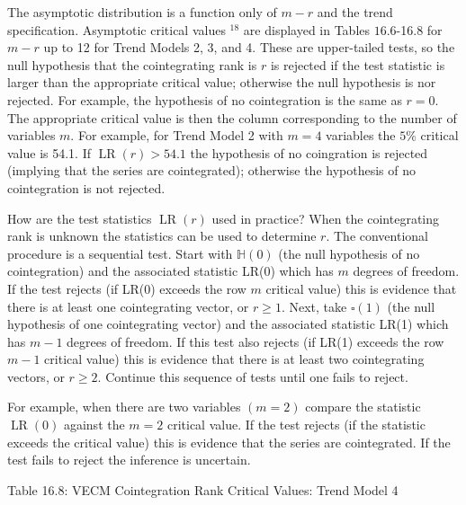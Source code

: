 \documentclass[10pt]{article}
\begin{document}
The asymptotic distribution is a function only of $m-r$ and the trend specification. Asymptotic critical values ${ }^{18}$ are displayed in Tables $16.6$-16.8 for $m-r$ up to 12 for Trend Models 2, 3, and 4. These are upper-tailed tests, so the null hypothesis that the cointegrating rank is $r$ is rejected if the test statistic is larger than the appropriate critical value; otherwise the null hypothesis is nor rejected. For example, the hypothesis of no cointegration is the same as $r=0$. The appropriate critical value is then the column corresponding to the number of variables $m$. For example, for Trend Model 2 with $m=4$ variables the $5 \%$ critical value is 54.1. If $\operatorname{LR}(r)>54.1$ the hypothesis of no coingration is rejected (implying that the series are cointegrated); otherwise the hypothesis of no cointegration is not rejected.

How are the test statistics $\operatorname{LR}(r)$ used in practice? When the cointegrating rank is unknown the statistics can be used to determine $r$. The conventional procedure is a sequential test. Start with $\mathbb{H}(0)$ (the null hypothesis of no cointegration) and the associated statistic LR(0) which has $m$ degrees of freedom. If the test rejects (if LR(0) exceeds the row $m$ critical value) this is evidence that there is at least one cointegrating vector, or $r \geq 1$. Next, take $\mathbb{\square}(1)$ (the null hypothesis of one cointegrating vector) and the associated statistic LR(1) which has $m-1$ degrees of freedom. If this test also rejects (if LR(1) exceeds the row $m-1$ critical value) this is evidence that there is at least two cointegrating vectors, or $r \geq 2$. Continue this sequence of tests until one fails to reject.

For example, when there are two variables $(m=2)$ compare the statistic $\operatorname{LR}(0)$ against the $m=2$ critical value. If the test rejects (if the statistic exceeds the critical value) this is evidence that the series are cointegrated. If the test fails to reject the inference is uncertain.

Table 16.8: VECM Cointegration Rank Critical Values: Trend Model 4
\end{document}
